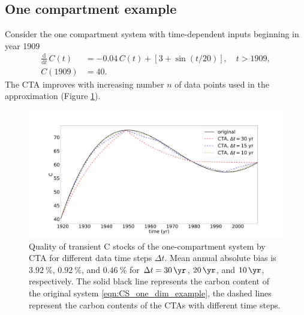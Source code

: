 \documentclass[11pt,a4paper]{article}
\newcommand{\deriv}[1]{\frac{\mathrm{d}}{\mathrm{d}#1}}
\begin{document}
\subsection{One compartment example}
Consider the one compartment system with time-dependent inputs beginning in year 1909
\begin{equation}\label{eqn:CS_one_dim_example}
    \begin{aligned}
        \deriv{t}\,C(t) &= -0.04\,C(t) + \left[3+\sin(t/20)\right],\quad t>1909,\\
        C(1909) &= 40.
    \end{aligned}
\end{equation}
 The CTA improves with increasing number $n$ of data points used in the approximation (Figure \ref{fig:CS_one_dim_example}).

\begin{figure}[htbp]
    \centering 
    \includegraphics[width=1.0\linewidth]{figs/interpol_pwc_1.pdf}
    \caption{Quality of transient C stocks of the one-compartment system by CTA for different data time steps $\Delta t$.
    Mean annual absolute bias is $\SI{3.92}{\percent}$, $\SI{0.92}{\percent}$, and $\SI{0.46}{\percent}$ for $\Delta{t} = \SI{30}{\yr}$, $\SI{20}{\yr}$, and $\SI{10}{\yr}$, respectively.
    The solid black line represents the carbon content of the original system \eqref{eqn:CS_one_dim_example}, the dashed lines represent the carbon contents of the CTAs with different time steps.
    }    
    \label{fig:CS_one_dim_example}
\end{figure}        
\end{document}
